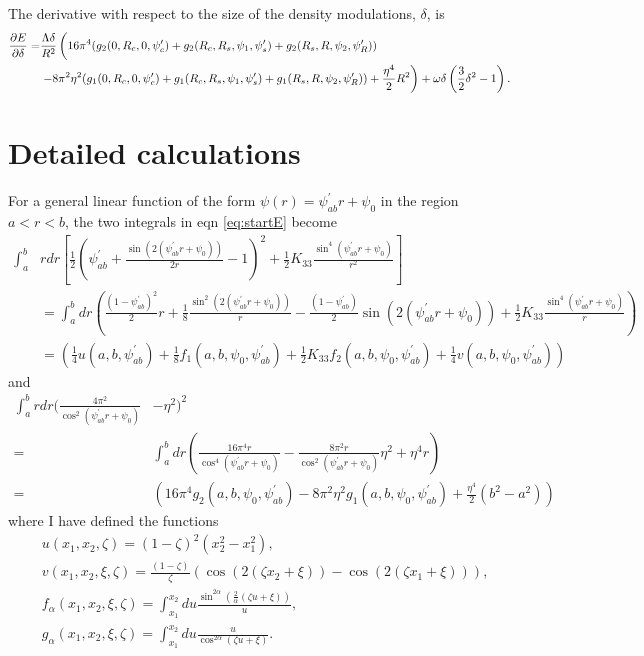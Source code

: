 \documentclass[12pt]{article}
\begin{document}
The derivative with respect to the size of the density modulations, $\delta$, is
\begin{align}
\frac{\partial E}{\partial \delta}=&\frac{\Lambda\delta}{R^2}\left(\vphantom{\frac{1}{2}}16\pi^4(g_2(0,R_c,0,\psi_c^{\prime})+g_2(R_c,R_s,\psi_1,\psi_s^{\prime})+g_2(R_s,R,\psi_2,\psi_R^{\prime}))\right.\nonumber\\
&\left.-8\pi^2\eta^2(g_1(0,R_c,0,\psi_c^{\prime})+g_1(R_c,R_s,\psi_1,\psi_s^{\prime})+g_1(R_s,R,\psi_2,\psi_R^{\prime}))+\frac{\eta^4}{2}R^2\right)+\omega\delta\left(\frac{3}{2}\delta^2-1\right).
\end{align}


\section{Detailed calculations}
For a general linear function of the form $\psi(r)=\psi_{ab}^{\prime}r+\psi_0$ in the region $a<r<b$, the two integrals in eqn \ref{eq:startE} become
\begin{align}\label{eq:first_int}
\int_{a}^{b}&rdr\left[\frac{1}{2}\left(\psi_{ab}^{\prime}+\frac{\sin(2(\psi_{ab}^{\prime}r+\psi_0))}{2r}-1\right)^2+\frac{1}{2}K_{33}\frac{\sin^4(\psi_{ab}^{\prime}r+\psi_0)}{r^2}\right]\nonumber\\
&=\int_{a}^{b}dr\left(\frac{(1-\psi_{ab}^{\prime})^2}{2}r+\frac{1}{8}\frac{\sin^2(2(\psi_{ab}^{\prime}r+\psi_0))}{r}-\frac{(1-\psi_{ab}^{\prime})}{2}\sin(2(\psi_{ab}^{\prime}r+\psi_0))+\frac{1}{2}K_{33}\frac{\sin^4(\psi_{ab}^{\prime}r+\psi_0)}{r}\right)\nonumber\\
&=\left(\frac{1}{4}u(a,b,\psi_{ab}^{\prime})+\frac{1}{8}f_1(a,b,\psi_0,\psi_{ab}^{\prime})+\frac{1}{2}K_{33}f_2(a,b,\psi_0,\psi_{ab}^{\prime})+\frac{1}{4}v(a,b,\psi_0,\psi_{ab}^{\prime})\right)
\end{align}
and
\begin{align}\label{eq:second_int}
\int_{a}^{b}rdr\bigg(\frac{4\pi^2}{\cos^2(\psi_{ab}^{\prime}r+\psi_0)}&-\eta^2\bigg)^2\nonumber\\
=&\int_{a}^{b}dr\left(\frac{16\pi^4r}{\cos^4(\psi_{ab}^{\prime}r+\psi_0)}-\frac{8\pi^2r}{\cos^2(\psi_{ab}^{\prime}r+\psi_0)}\eta^2+\eta^4r\right)\nonumber\\
=&\left(16\pi^4g_2(a,b,\psi_0,\psi_{ab}^{\prime})-8\pi^2\eta^2g_1(a,b,\psi_0,\psi_{ab}^{\prime})+\frac{\eta^4}{2}(b^2-a^2)\right)
\end{align}
where I have defined the functions
\begin{subequations}
\begin{align}
&u(x_1,x_2,\zeta)=(1-\zeta)^2(x_2^2-x_1^2),\label{eq:ufunc}\\
&v(x_1,x_2,\xi,\zeta)=\frac{(1-\zeta)}{\zeta}(\cos(2(\zeta x_2+\xi))-\cos(2(\zeta x_1+\xi))),\label{eq:vfunc}\\
&f_{\alpha}(x_1,x_2,\xi,\zeta)=\int_{x_1}^{x_2}du\frac{\sin^{2\alpha}\left(\frac{2}{\alpha}(\zeta u+\xi)\right)}{u},\label{eq:falpha}\\
&g_{\alpha}(x_1,x_2,\xi,\zeta)=\int_{x_1}^{x_2}du\frac{u}{\cos^{2\alpha}(\zeta u+\xi)}.\label{eq:galpha}
\end{align}
\end{subequations}
\end{document}
